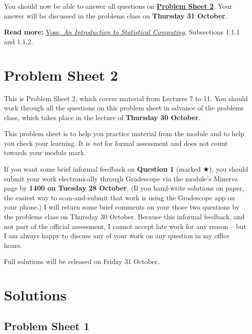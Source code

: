 \documentclass[
  letterpaper,
  DIV=11,
  numbers=noendperiod]{scrreprt}
\theoremstyle{plain}
\theoremstyle{definition}
\theoremstyle{definition}
\theoremstyle{remark}
\begin{document}
You should now be able to answer all questions on
\hyperref[P2]{\textbf{Problem Sheet 2}}. Your answer will be discussed
in the problems class on \textbf{Thursday 31 October}.

\textbf{Read more:}
\href{https://leeds.primo.exlibrisgroup.com/permalink/44LEE_INST/1fj430b/cdi_askewsholts_vlebooks_9781118728031}{Voss,
\emph{An Introduction to Statistical Computing}}, Subsections 1.1.1 and
1.1.2.

\chapter*{Problem Sheet 2}\label{P2}


This is Problem Sheet 2, which covers material from Lectures 7 to 11.
You should work through all the questions on this problem sheet in
advance of the problems class, which takes place in the lecture of
\textbf{Thursday 30 October}.

This problem sheet is to help you practice material from the module and
to help you check your learning. It is \emph{not} for formal assessment
and does not count towards your module mark.

If you want some brief informal feedback on \textbf{Question 1} (marked
★), you should submit your work electronically through Gradescope via
the module's Minerva page by \textbf{1400 on Tuesday 28 October}. (If
you hand-write solutions on paper, the easiest way to scan-and-submit
that work is using the Gradescope app on your phone.) I will return some
brief comments on your those two questions by the problems class on
Thursday 30 October. Because this informal feedback, and not part of the
official assessment, I cannot accept late work for any reason -- but I
am always happy to discuss any of your work on any question in my office
hours.

Full solutions will be released on Friday 31 October.


\chapter*{Solutions}\label{solutions}


\section*{Problem Sheet 1}\label{P1-sols}

\end{document}
